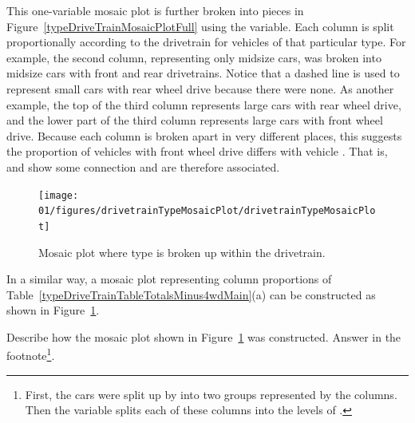This one-variable mosaic plot is further broken into pieces in Figure~\ref{typeDriveTrainMosaicPlotFull} using the  variable. Each column is split proportionally according to the drivetrain for vehicles of that particular type. For example, the second column, representing only midsize cars, was broken into midsize cars with front and rear drivetrains. Notice that a dashed line is used to represent small cars with rear wheel drive because there were none. %
As another example, the top of the third column represents large cars with rear wheel drive, and the lower part of the third column represents large cars with front wheel drive. Because each column is broken apart in very different places, this suggests the proportion of vehicles with front wheel drive differs with vehicle . That is,  and  show some connection and are therefore associated.
\begin{figure}
   \centering
   \texttt{[image: 01/figures/drivetrainTypeMosaicPlot/drivetrainTypeMosaicPlot]}
   \caption{Mosaic plot where type is broken up within the drivetrain.}
   \label{drivetrainTypeMosaicPlot}
\end{figure}



In a similar way, a mosaic plot representing column proportions of Table~\ref{typeDriveTrainTableTotalsMinus4wdMain}(a) can be constructed as shown in Figure~\ref{drivetrainTypeMosaicPlot}.


\begin{exercise}
Describe how the mosaic plot shown in Figure~\ref{drivetrainTypeMosaicPlot} was constructed. Answer in the footnote\footnote{First, the cars were split up by  into two groups represented by the columns. Then the  variable splits each of these columns into the levels of .}.
\end{exercise}

